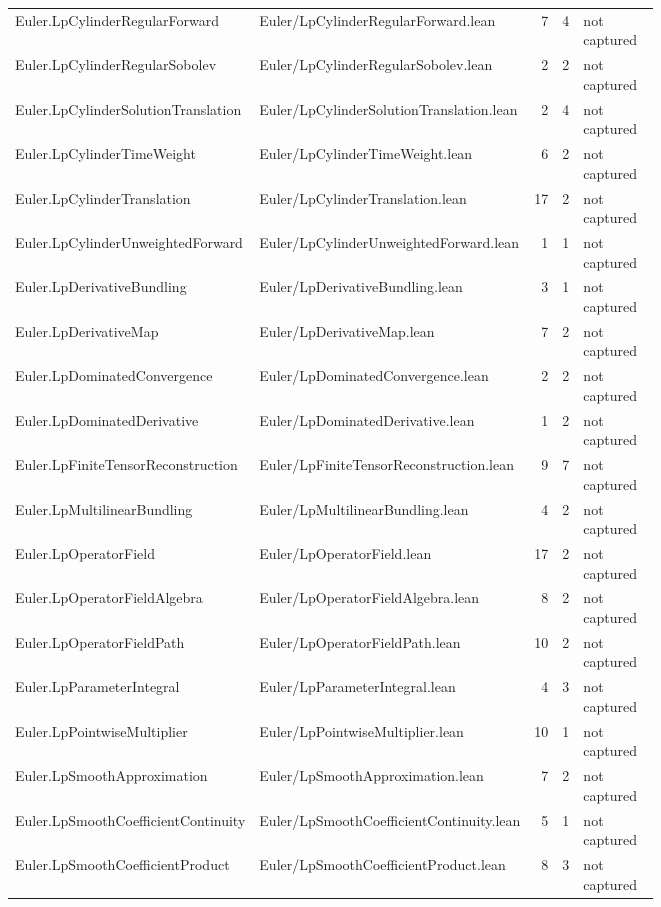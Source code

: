 \documentclass[10pt]{article}
\begin{document}
\begin{longtable}{p{0.28\linewidth}p{0.27\linewidth}r r p{0.20\linewidth}}
Euler.LpCylinderRegularForward & Euler/LpCylinderRegularForward.lean & 7 & 4 & not captured\\
Euler.LpCylinderRegularSobolev & Euler/LpCylinderRegularSobolev.lean & 2 & 2 & not captured\\
Euler.LpCylinderSolutionTranslation & Euler/LpCylinderSolutionTranslation.lean & 2 & 4 & not captured\\
Euler.LpCylinderTimeWeight & Euler/LpCylinderTimeWeight.lean & 6 & 2 & not captured\\
Euler.LpCylinderTranslation & Euler/LpCylinderTranslation.lean & 17 & 2 & not captured\\
Euler.LpCylinderUnweightedForward & Euler/LpCylinderUnweightedForward.lean & 1 & 1 & not captured\\
Euler.LpDerivativeBundling & Euler/LpDerivativeBundling.lean & 3 & 1 & not captured\\
Euler.LpDerivativeMap & Euler/LpDerivativeMap.lean & 7 & 2 & not captured\\
Euler.LpDominatedConvergence & Euler/LpDominatedConvergence.lean & 2 & 2 & not captured\\
Euler.LpDominatedDerivative & Euler/LpDominatedDerivative.lean & 1 & 2 & not captured\\
Euler.LpFiniteTensorReconstruction & Euler/LpFiniteTensorReconstruction.lean & 9 & 7 & not captured\\
Euler.LpMultilinearBundling & Euler/LpMultilinearBundling.lean & 4 & 2 & not captured\\
Euler.LpOperatorField & Euler/LpOperatorField.lean & 17 & 2 & not captured\\
Euler.LpOperatorFieldAlgebra & Euler/LpOperatorFieldAlgebra.lean & 8 & 2 & not captured\\
Euler.LpOperatorFieldPath & Euler/LpOperatorFieldPath.lean & 10 & 2 & not captured\\
Euler.LpParameterIntegral & Euler/LpParameterIntegral.lean & 4 & 3 & not captured\\
Euler.LpPointwiseMultiplier & Euler/LpPointwiseMultiplier.lean & 10 & 1 & not captured\\
Euler.LpSmoothApproximation & Euler/LpSmoothApproximation.lean & 7 & 2 & not captured\\
Euler.LpSmoothCoefficientContinuity & Euler/LpSmoothCoefficientContinuity.lean & 5 & 1 & not captured\\
Euler.LpSmoothCoefficientProduct & Euler/LpSmoothCoefficientProduct.lean & 8 & 3 & not captured\\

\end{longtable}
\end{document}
